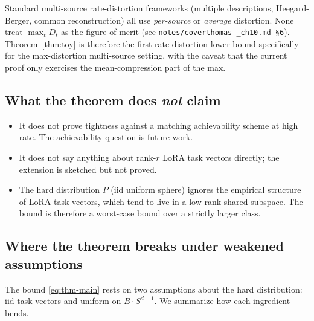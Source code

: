\documentclass{article}
\theoremstyle{remark}
\begin{document}
Standard multi-source rate-distortion frameworks (multiple
descriptions, Heegard-Berger, common reconstruction) all use
\emph{per-source} or \emph{average} distortion. None treat
$\max_t D_t$ as the figure of merit (see \texttt{notes/coverthomas
\_ch10.md \S6}). Theorem~\ref{thm:toy} is therefore the first
rate-distortion lower bound specifically for the max-distortion
multi-source setting, with the caveat that the current proof only
exercises the mean-compression part of the max.

\subsection{What the theorem does \emph{not} claim}

\begin{itemize}
  \item It does not prove tightness against a matching achievability
  scheme at high rate. The achievability question is future work.
  \item It does not say anything about rank-$r$ LoRA task vectors
  directly; the extension is sketched but not proved.
  \item The hard distribution $P$ (iid uniform sphere) ignores the
  empirical structure of LoRA task vectors, which tend to live in a
  low-rank shared subspace. The bound is therefore a worst-case
  bound over a strictly larger class.
\end{itemize}

\subsection{Where the theorem breaks under weakened assumptions}
\label{sec:break}

The bound \eqref{eq:thm-main} rests on two assumptions about the hard
distribution: iid task vectors and uniform on $B\cdot S^{d-1}$. We
summarize how each ingredient bends.
\end{document}

